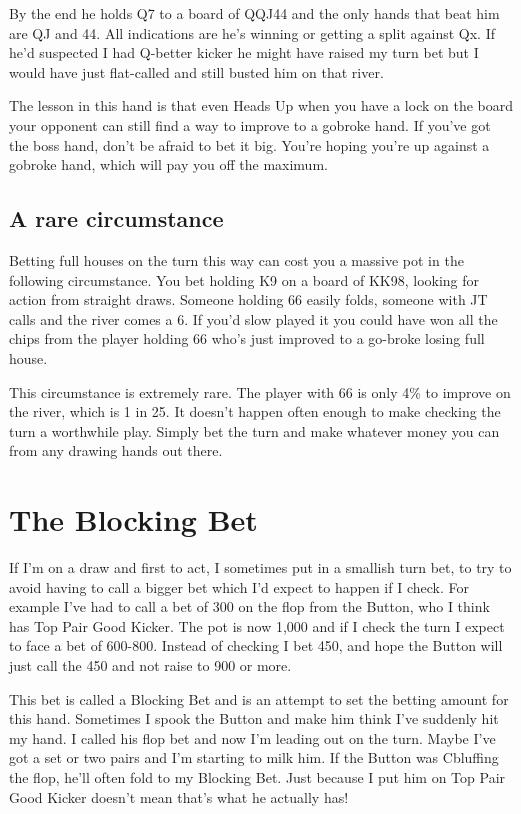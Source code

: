 By the end he holds Q7 to a board of QQJ44 and the only hands that beat
him are QJ and 44. All indications are he's winning or getting a split
against Qx. If he'd suspected I had Q-better kicker he might have
raised my turn bet but I would have just flat-called and still busted
him on that river.

The lesson in this hand is that even Heads Up when you have a lock on
the board your opponent can still find a way to improve to a gobroke
hand. If you've got the boss hand, don't be afraid to bet it big. You're
hoping you're up against a gobroke hand, which will pay you off
the maximum.

\subsection*{A rare circumstance}

Betting full houses on the turn this way can cost you a massive pot in
the following circumstance. You bet holding K9 on a board
of KK98, looking for action from straight draws. Someone
holding 66 easily folds, someone with JT calls and the river comes
a 6. If you'd slow played it you could have won all the chips from
the player holding 66 who's just improved to a go-broke losing full
house.

This circumstance is extremely rare. The player with 66 is only 4\% to
improve on the river, which is 1 in 25. It doesn't happen often enough
to make checking the turn a worthwhile play. Simply bet
the turn and make whatever money you can from any drawing hands
out there.

\section{The Blocking Bet}

If I'm on a draw and first to act, I sometimes put in a smallish
turn bet, to try to avoid having to call a bigger bet which
I'd expect to happen if I check. For example I've had to call a bet
of 300 on the flop from the Button, who I think has Top Pair
Good Kicker. The pot is now 1,000 and if I check the turn I expect to
face a bet of 600-800. Instead of checking I bet 450, and hope the Button
will just call the 450 and not raise to 900 or more.

This bet is called a Blocking Bet and is an attempt to set the betting
amount for this hand. Sometimes I spook the Button and make him think I've
suddenly hit my hand. I called his flop bet and now I'm leading out
on the turn. Maybe I've got a set or two pairs and I'm starting to
milk him. If the Button was Cbluffing
the flop, he'll often fold to my Blocking Bet. Just because I put him
on Top Pair Good Kicker doesn't mean that's what he actually has!

